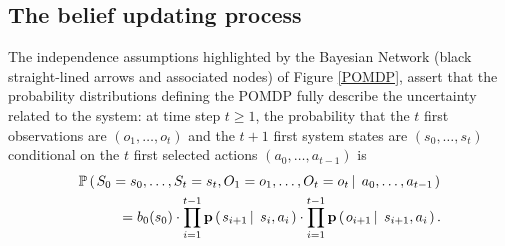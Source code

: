 \subsection{The belief updating process}
\label{thebeliefprocess}
The independence assumptions highlighted by the Bayesian Network 
(black straight-lined arrows and associated nodes)
of Figure \ref{POMDP}, assert that the probability distributions
defining the POMDP fully describe the uncertainty related to the system:
at time step $t \geqslant 1$, the probability that the $t$ first observations
are $(o_1,\ldots,o_t)$ and the $t+1$ first system states are $(s_0,\ldots,s_t)$
conditional on the $t$ first selected actions $(a_0, \ldots, a_{t-1})$ is
\begin{align*} 
&\mathbb{P} \left( \left.  S_0 = s_0, \ldots, S_t = s_t, O_1=o_1, \ldots,O_t = o_t \, \right| \left. \, a_0, \ldots, a_{t-1}  \right. \right) \\
& \hspace{1cm} = b_0(s_0) \cdot \prod_{i=1}^{t-1} \textbf{p} \left( \left.  s_{i+1} \, \right| \left. \, s_i, a_i  \right. \right) \cdot \prod_{i=1}^{t-1} \textbf{p} \left( \left.  o_{i+1} \, \right| \left. \, s_{i+1}, a_i  \right. \right).
\end{align*}

